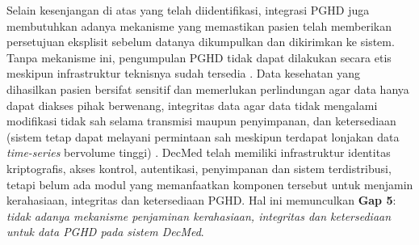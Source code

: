 Selain kesenjangan di atas yang telah diidentifikasi, integrasi PGHD juga membutuhkan adanya mekanisme yang memastikan pasien telah memberikan persetujuan eksplisit sebelum datanya dikumpulkan dan dikirimkan ke sistem. 
Tanpa mekanisme ini, pengumpulan PGHD tidak dapat dilakukan secara etis meskipun infrastruktur teknisnya sudah tersedia \parencite{Khatiwada_Yang_Lin_Blobel_2024_PGHD_Understanding}.
Data kesehatan yang dihasilkan pasien bersifat sensitif dan memerlukan perlindungan agar data hanya dapat diakses pihak berwenang, integritas data agar data tidak mengalami modifikasi tidak sah selama transmisi maupun penyimpanan, dan ketersediaan (sistem tetap dapat melayani permintaan sah meskipun terdapat lonjakan data \textit{time-series} bervolume tinggi) \parencite{Khatiwada_Yang_Lin_Blobel_2024_PGHD_Understanding}.
DecMed telah memiliki infrastruktur identitas kriptografis, akses kontrol, autentikasi, penyimpanan dan sistem terdistribusi, tetapi belum ada modul yang memanfaatkan komponen tersebut untuk menjamin kerahasiaan, integritas dan ketersediaan PGHD\@.
Hal ini memunculkan \textbf{Gap 5}: \emph{tidak adanya mekanisme penjaminan kerahasiaan, integritas dan ketersediaan untuk data PGHD pada sistem DecMed}.


